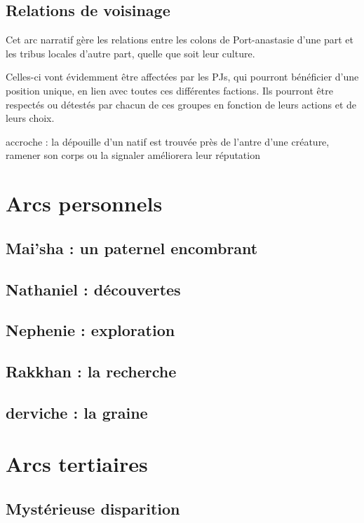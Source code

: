 \documentclass[10pt,a4paper]{book}
\begin{document}
\subsection{Relations de voisinage}
Cet arc narratif gère les relations entre les colons de Port-anastasie d'une part et les tribus locales d'autre part, quelle que soit leur culture. 

Celles-ci vont évidemment être affectées par les PJs, qui pourront bénéficier d'une position unique, en lien avec toutes ces différentes factions. Ils pourront être respectés ou détestés par chacun de ces groupes en fonction de leurs actions et de leurs choix.

accroche : la dépouille d'un natif est trouvée près de l'antre d'une créature, ramener son corps ou la signaler améliorera leur réputation
\section{Arcs personnels}
\subsection{Mai'sha : un paternel encombrant}
\subsection{Nathaniel : découvertes}
\subsection{Nephenie : exploration}
\subsection{Rakkhan : la recherche}
\subsection{derviche : la graine}
\section{Arcs tertiaires}
\subsection{Mystérieuse disparition}
\end{document}
